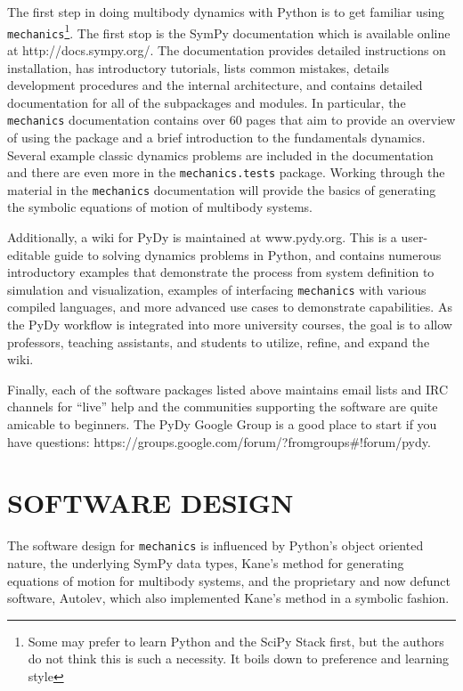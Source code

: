 \documentclass[twocolumn,10pt]{asme2e}
\begin{document}
The first step in doing multibody dynamics with Python is to get familiar using
\verb|mechanics|\footnote{Some may prefer to learn Python and the SciPy Stack
first, but the authors do not think this is such a necessity. It boils down to
preference and learning style}. The first stop is the SymPy documentation which
is available online at http://docs.sympy.org/. The documentation provides
detailed instructions on installation, has introductory tutorials, lists common
mistakes, details development procedures and the internal architecture, and
contains detailed documentation for all of the subpackages and modules. In
particular, the \verb|mechanics| documentation contains over 60 pages that aim
to provide an overview of using the package and a brief introduction to the
fundamentals dynamics. Several example classic dynamics problems are included
in the documentation and there are even more in the \verb|mechanics.tests|
package. Working through the material in the \verb|mechanics| documentation
will provide the basics of generating the symbolic equations of motion of
multibody systems.

Additionally, a wiki for PyDy is maintained at www.pydy.org. This is a
user-editable guide to solving dynamics problems in Python, and contains
numerous introductory examples that demonstrate the process from system
definition to simulation and visualization, examples of interfacing
\verb|mechanics| with various compiled languages, and more advanced use cases
to demonstrate capabilities. As the PyDy workflow is integrated into more
university courses, the goal is to allow professors, teaching assistants, and
students to utilize, refine, and expand the wiki.

Finally, each of the software packages listed above maintains email lists and
IRC channels for ``live'' help and the communities supporting the software are
quite amicable to beginners. The PyDy Google Group is a good place to start if
you have questions: https://groups.google.com/forum/?fromgroups#!forum/pydy.
%
\section*{SOFTWARE DESIGN}
The software design for \verb|mechanics| is influenced by Python's object
oriented nature, the underlying SymPy data types, Kane’s method for generating
equations of motion\cite{Kane1985} for multibody systems, and the proprietary
and now defunct software, Autolev\cite{Kane2000}, which also implemented Kane's
method in a symbolic fashion.
\end{document}

